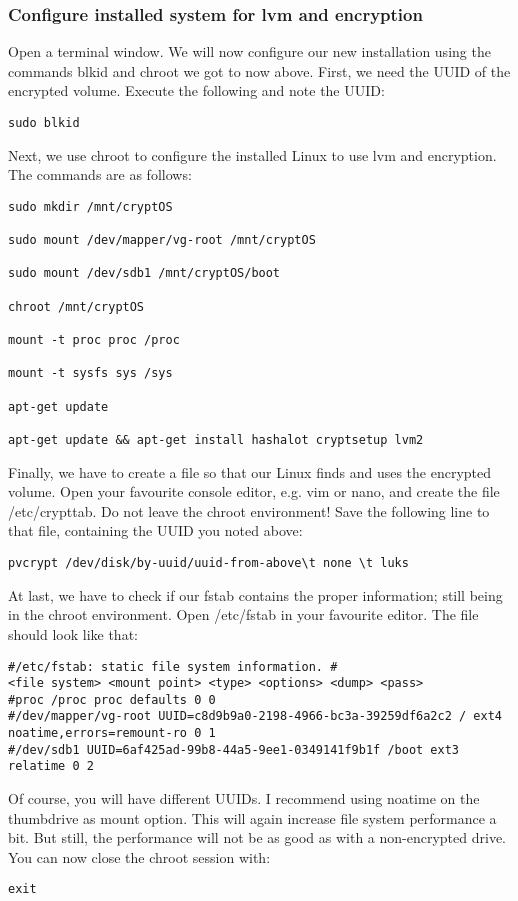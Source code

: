 \documentclass[12pt,a4paper]{article}
\begin{document}
\subsubsection{Configure installed system for lvm and encryption}
Open a terminal window. We will now configure our new installation using the commands blkid and chroot we got to now above. First, we need the UUID of the encrypted volume. Execute the following and note the UUID:
\begin{Verbatim}[commandchars=\\\{\}]
sudo blkid
\end{Verbatim}
Next, we use chroot to configure the installed Linux to use lvm and encryption. The commands are as follows:
\begin{Verbatim}[commandchars=\\\{\}]
sudo mkdir /mnt/cryptOS

sudo mount /dev/mapper/vg-root /mnt/cryptOS

sudo mount /dev/sdb1 /mnt/cryptOS/boot

chroot /mnt/cryptOS

mount -t proc proc /proc

mount -t sysfs sys /sys

apt-get update

apt-get update && apt-get install hashalot cryptsetup lvm2
\end{Verbatim}
Finally, we have to create a file so that our Linux finds and uses the encrypted volume. Open your favourite console editor, e.g. vim or nano, and create the file /etc/crypttab. Do not leave the chroot environment! Save the following line to that file, containing the UUID you noted above:
\begin{Verbatim}[commandchars=\\\{\}]
pvcrypt /dev/disk/by-uuid/uuid-from-above\t none \t luks
\end{Verbatim}
At last, we have to check if our fstab contains the proper information; still being in the chroot environment. Open /etc/fstab in your favourite editor. The file should look like that:
\begin{Verbatim}[commandchars=\\\{\}]
#/etc/fstab: static file system information. #
<file system> <mount point> <type> <options> <dump> <pass>	
#proc /proc proc defaults 0 0		
#/dev/mapper/vg-root UUID=c8d9b9a0-2198-4966-bc3a-39259df6a2c2 / ext4
noatime,errors=remount-ro 0 1  
#/dev/sdb1 UUID=6af425ad-99b8-44a5-9ee1-0349141f9b1f /boot ext3 relatime 0 2
\end{Verbatim}
Of course, you will have different UUIDs. I recommend using noatime on the thumbdrive as mount option. This will again increase file system performance a bit. But still, the performance will not be as good as with a non-encrypted drive. You can now close the chroot session with:
\begin{Verbatim}[commandchars=\\\{\}]
exit
\end{Verbatim}
\end{document}
